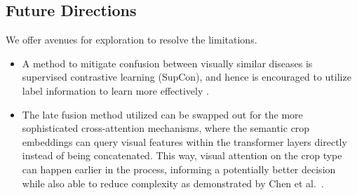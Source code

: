 \documentclass[runningheads]{llncs}
\begin{document}
\subsection{Future Directions}

We offer avenues for exploration to resolve the limitations.
\begin{itemize}
\item A method to mitigate confusion between visually similar diseases is supervised contrastive learning (SupCon), and hence is encouraged to utilize label information to learn more effectively \cite{khosla2020supervised}.
\item The late fusion method utilized can be swapped out for the more sophisticated cross-attention mechanisms, where the semantic crop embeddings can query visual features within the transformer layers directly instead of being concatenated. This way, visual attention on the crop type can happen earlier in the process, informing a potentially better decision while also able to reduce complexity as demonstrated by Chen et al.~\cite{Chen_2021_ICCV}.
\end{itemize}




\end{document}
